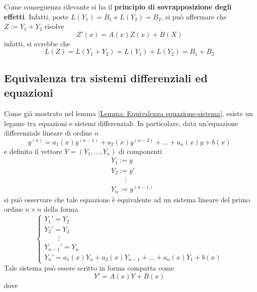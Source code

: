 \begin{oss}    
Come conseguenza rilevante si ha il \textbf{principio di sovrapposizione degli effetti}. Infatti, poste $L(Y_1)=B_1$ e $L(Y_2)=B_2$, si può affermare che
$Z:=Y_1+Y_2$ risolve 
\begin{equation*}
    Z'(x)=A(x)Z(x)+B(X)
\end{equation*}
infatti, si avrebbe che
\begin{equation*}
L(Z)=L(Y_1+Y_2)=L(Y_1)+L(Y_2)=B_1+B_2
\end{equation*}
\end{oss}
\subsection{Equivalenza tra sistemi differenziali ed equazioni}
Come già mostrato nel lemma \ref{Lemma: Equivalenza equazione-sistema}, esiste un legame tra equazioni e sistemi differenziali. In particolare, data un'equazione differenziale lineare di ordine $n$
\begin{equation*}
    y^{(n)}=a_1(x)y^{(n-1)}+a_2(x)y^{(n-2)}+ \dots+a_n(x)y+b(x)
\end{equation*}
e definito il vettore $Y=(Y_1, \dots, Y_n)$ di componenti
\begin{equation*}
\begin{aligned}
&Y_1:=y\\
&Y_2:=y'\\
&\qquad \vdots\\
&Y_n:=y^{(n-1)}
\end{aligned}
\end{equation*}
si può osservare che tale equazione è equivalente ad un sistema lineare del primo ordine $n\times n$ della forma
\begin{equation*}
    \begin{cases}
        Y_1'=Y_2\\
        Y_2'=Y_3\\
        \qquad\vdots\\
        Y_{n-1}'=Y_n\\
        Y_n'= a_1(x) Y_n+ a_2(x) Y_{n-1}+ \dots+ a_n(x) Y_1 + b(x)
    \end{cases}
\end{equation*}
Tale sistema può essere scritto in forma compatta come \begin{equation*}
Y'=A(x)Y+B(x)
\end{equation*}
dove
